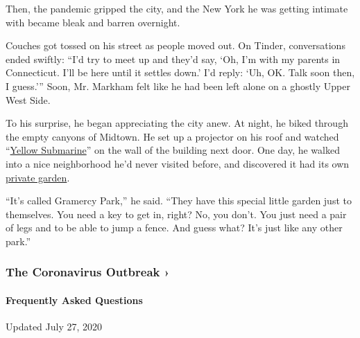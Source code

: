 Then, the pandemic gripped the city, and the New York he was getting
intimate with became bleak and barren overnight.

Couches got tossed on his street as people moved out. On Tinder,
conversations ended swiftly: ``I'd try to meet up and they'd say, `Oh,
I'm with my parents in Connecticut. I'll be here until it settles down.'
I'd reply: `Uh, OK. Talk soon then, I guess.''' Soon, Mr. Markham felt
like he had been left alone on a ghostly Upper West Side.

To his surprise, he began appreciating the city anew. At night, he biked
through the empty canyons of Midtown. He set up a projector on his roof
and watched ``\href{https://www.youtube.com/watch?v=vefJAtG-ZKI}{Yellow
Submarine}'' on the wall of the building next door. One day, he walked
into a nice neighborhood he'd never visited before, and discovered it
had its own
\href{https://gothamist.com/news/how-gramercy-park-became-a-private-playground-for-nycs-elite}{private
garden}.

``It's called Gramercy Park,'' he said. ``They have this special little
garden just to themselves. You need a key to get in, right? No, you
don't. You just need a pair of legs and to be able to jump a fence. And
guess what? It's just like any other park.''

\href{https://www.nytimes.com/news-event/coronavirus?action=click\&pgtype=Article\&state=default\&region=MAIN_CONTENT_3\&context=storylines_faq}{}

\hypertarget{the-coronavirus-outbreak-}{%
\subsubsection{The Coronavirus Outbreak
›}\label{the-coronavirus-outbreak-}}

\hypertarget{frequently-asked-questions}{%
\paragraph{Frequently Asked
Questions}\label{frequently-asked-questions}}

Updated July 27, 2020

